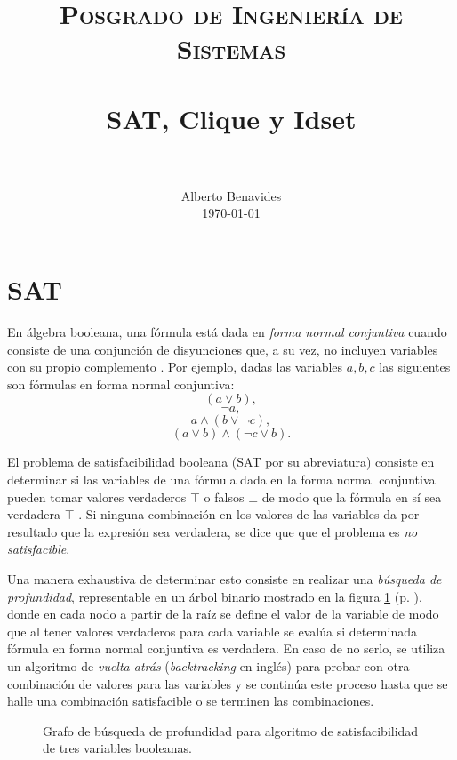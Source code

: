 \documentclass[paper=leter, fontsize=11pt]{scrartcl}
\title{
		\usefont{OT1}{bch}{b}{n}
		\normalfont \normalsize \textsc{Posgrado de Ingeniería de Sistemas} \\ [25pt]
		\horrule{0.5pt} \\[0.4cm]
		\huge SAT, Clique y Idset \\
		\horrule{2pt} \\[0.5cm]
}
\author{
		\normalfont 								\normalsize
        Alberto Benavides\\[-3pt]		\normalsize
        \today
}
\date{}
\numberwithin{equation}{section}		%
\numberwithin{figure}{section}			%
\numberwithin{table}{section}				%
\begin{document}
\maketitle
\section{SAT}
En álgebra booleana, una fórmula está dada en \textit{forma normal conjuntiva} cuando consiste de una conjunción de disyunciones que, a su vez, no incluyen variables con su propio complemento \cite{fnc}. Por ejemplo, dadas las variables $a, b, c$ las siguientes son fórmulas en forma normal conjuntiva:
$$(a \lor b), $$
$$ \neg a, $$
$$a \land (b \lor \neg c),$$
$$(a \lor b) \land (\neg c \lor b).$$

El problema de satisfacibilidad booleana (SAT por su abreviatura) consiste en determinar si las variables de una fórmula dada en la forma normal conjuntiva pueden tomar valores verdaderos $\top$ o falsos $\bot$ de modo que la fórmula en sí sea verdadera $\top$ \cite{sat}. Si ninguna combinación en los valores de las variables da por resultado que la expresión sea verdadera, se dice que que el problema es \textit{no satisfacible}.

Una manera exhaustiva de determinar esto consiste en realizar una \textit{búsqueda de profundidad}, representable en un árbol binario mostrado en la figura \ref{profundidad} (p. \pageref{profundidad}), donde en cada nodo a partir de la raíz se define el valor de la variable de modo que al tener valores verdaderos para cada variable se evalúa si determinada fórmula en forma normal conjuntiva es verdadera. En caso de no serlo, se utiliza un algoritmo de \textit{vuelta atrás} (\textit{backtracking} en inglés) \cite{bt} para probar con otra combinación de valores para las variables y se continúa este proceso hasta que se halle una combinación satisfacible o se terminen las combinaciones.

\begin{figure}
	\centering
	\caption{Grafo de búsqueda de profundidad para algoritmo de satisfacibilidad de tres variables booleanas.}
	\label{profundidad}
\end{figure}
\end{document}
